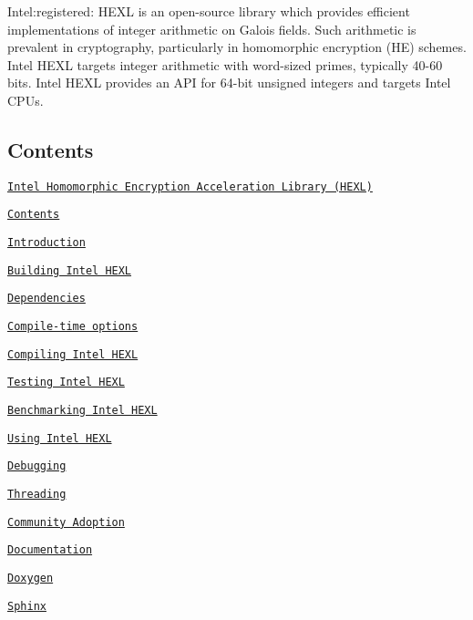 Intel\+:registered\+: H\+E\+XL is an open-\/source library which provides efficient implementations of integer arithmetic on Galois fields. Such arithmetic is prevalent in cryptography, particularly in homomorphic encryption (HE) schemes. Intel H\+E\+XL targets integer arithmetic with word-\/sized primes, typically 40-\/60 bits. Intel H\+E\+XL provides an A\+PI for 64-\/bit unsigned integers and targets Intel C\+P\+Us.

\subsection*{Contents}


\begin{DoxyItemize}
\item \href{#intel-homomorphic-encryption-acceleration-library-hexl}{\tt Intel Homomorphic Encryption Acceleration Library (H\+E\+XL)}
\begin{DoxyItemize}
\item \href{#contents}{\tt Contents}
\item \href{#introduction}{\tt Introduction}
\item \href{#building-intel-hexl}{\tt Building Intel H\+E\+XL}
\begin{DoxyItemize}
\item \href{#dependencies}{\tt Dependencies}
\item \href{#compile-time-options}{\tt Compile-\/time options}
\item \href{#compiling-intel-hexl}{\tt Compiling Intel H\+E\+XL}
\end{DoxyItemize}
\item \href{#testing-intel-hexl}{\tt Testing Intel H\+E\+XL}
\item \href{#benchmarking-intel-hexl}{\tt Benchmarking Intel H\+E\+XL}
\item \href{#using-intel-hexl}{\tt Using Intel H\+E\+XL}
\item \href{#debugging}{\tt Debugging}
\item \href{#threading}{\tt Threading}
\end{DoxyItemize}
\item \href{#community-adoption}{\tt Community Adoption}
\item \href{#documentation}{\tt Documentation}
\begin{DoxyItemize}
\item \href{#doxygen}{\tt Doxygen}
\item \href{#sphinx}{\tt Sphinx}
\end{DoxyItemize}

\end{DoxyItemize}

